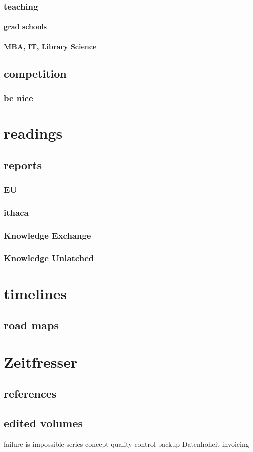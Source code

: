 \documentclass[guidelines,nonflat,modfonts] {langsci/langscibook}
\begin{document}
\subsection{teaching}
\subsubsection{grad schools}
\subsubsection{MBA, IT, Library Science}
\section{competition}
\subsection{be nice}
\chapter{readings}
\section{reports}
\subsection{EU}
\subsection{ithaca}
\subsection{Knowledge Exchange}
\subsection{Knowledge Unlatched}
\chapter{timelines}
\section{road maps}
\chapter{Zeitfresser}
\section{references}
\section{edited volumes}

failure is impossible
series concept
quality control
backup
Datenhoheit
invoicing
\end{document}
